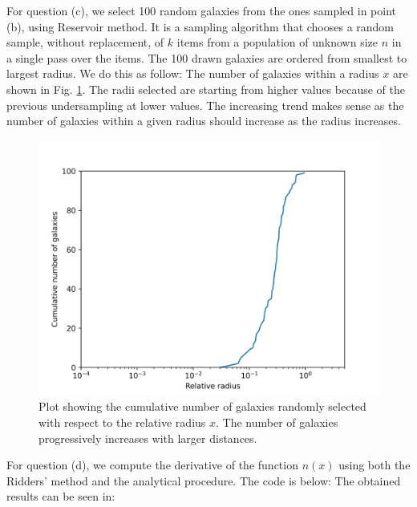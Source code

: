 For question (c), we select 100 random galaxies from the ones sampled in point (b), using Reservoir method. It is a sampling algorithm that chooses a random sample, without replacement, of $k$ items from a population of unknown size $n$ in a single pass over the items. The 100 drawn galaxies are ordered from smallest to largest radius. We do this as follow: 
The number of galaxies within a radius $x$ are shown in Fig. \ref{fig:cum_galaxies}. The radii selected are starting from higher values because of the previous undersampling at lower values. The increasing trend makes sense as the number of galaxies within a given radius should increase as the radius increases.

\begin{figure}[h!]
  \centering
  \includegraphics[width=0.9\linewidth]{./plots/my_solution_1c.png}
  \caption{Plot showing the cumulative number of galaxies randomly selected with respect to the relative radius $x$. The number of galaxies progressively increases with larger distances.}
  \label{fig:cum_galaxies}
\end{figure}

For question (d), we compute the derivative of the function $n(x)$ using both the Ridders' method and the analytical procedure. The code is below: 
The obtained results can be seen in: 


